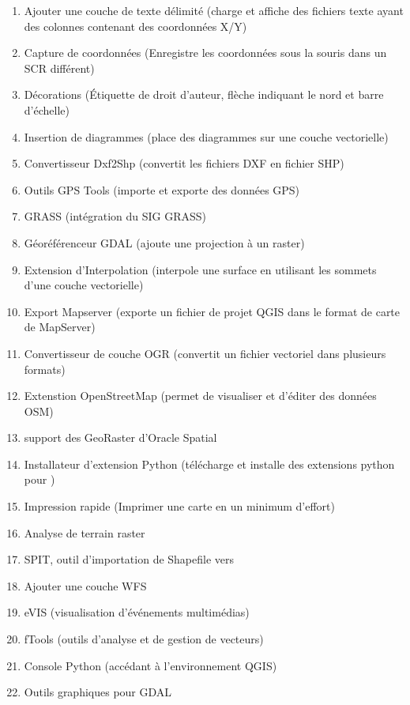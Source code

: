 
\begin{enumerate}
\item Ajouter une couche de texte délimité (charge et affiche des fichiers texte ayant des colonnes contenant des coordonnées X/Y)
\item Capture de coordonnées (Enregistre les coordonnées sous la souris dans un SCR différent)
\item Décorations (Étiquette de droit d'auteur, flèche indiquant le nord et barre d'échelle)
\item Insertion de diagrammes (place des diagrammes sur une couche vectorielle)
\item Convertisseur Dxf2Shp (convertit les fichiers DXF en fichier SHP)
\item Outils GPS Tools (importe et exporte des données GPS)
\item GRASS (intégration du SIG GRASS)
\item Géoréférenceur GDAL (ajoute une projection à un raster)
\item Extension d'Interpolation (interpole une surface en utilisant les sommets d'une couche vectorielle)
\item Export Mapserver (exporte un fichier de projet QGIS dans le format de carte de MapServer)
\item Convertisseur de couche OGR (convertit un fichier vectoriel dans plusieurs formats)
\item Extenstion OpenStreetMap (permet de visualiser et d'éditer des données OSM)
\item support des GeoRaster d'Oracle Spatial
\item Installateur d'extension Python (télécharge et installe des extensions python pour \qg)
\item Impression rapide (Imprimer une carte en un minimum d'effort)
\item Analyse de terrain raster
\item SPIT, outil d'importation de Shapefile vers \ppg
\item Ajouter une couche WFS 
\item eVIS (visualisation d'événements multimédias)
\item fTools (outils d'analyse et de gestion de vecteurs)
\item Console Python (accédant à l'environnement QGIS)
\item Outils graphiques pour GDAL
\end{enumerate}

